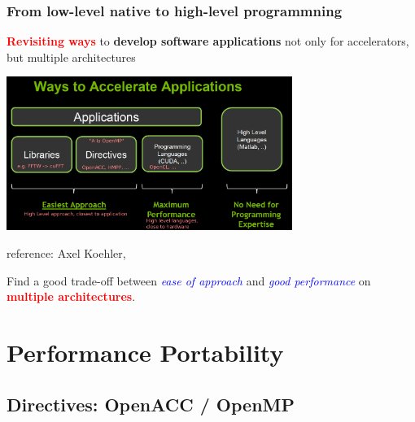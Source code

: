 \documentclass[9pt,hyperref={pdfpagemode=FullScreen,urlcolor=blue},xcolor=x11names]{beamer}
\begin{document}
\begin{frame}
  \frametitle{From low-level native to high-level programmning}

  \textcolor{red}{\textbf{Revisiting ways}} to \textbf{develop software applications} not only for accelerators, but multiple architectures 
  \begin{center}
    \includegraphics[height=5.0cm]{images/ways_to_accelerate_app2}
  \end{center}
  
  {\scriptsize reference: Axel Koehler, }

  Find a good trade-off between \textcolor{blue}{\textit{ease of approach}} and \textcolor{blue}{\textit{good performance}} on \textcolor{red}{\textbf{multiple architectures}}.
  
\end{frame}

%

%


%
%

\section{Performance Portability}



\subsection{Directives: OpenACC / OpenMP}
\end{document}
